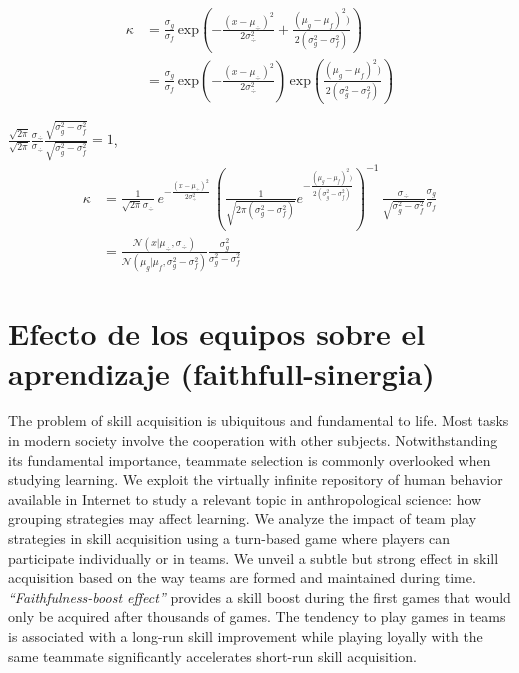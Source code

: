 \documentclass[a4paper,10pt]{book}
\newcommand{\N}{\mathcal{N}}
\theoremstyle{definition}
\newif\ifen
\newif\ifes
\newcommand{\en}[1]{\ifen#1\fi}
\newcommand{\es}[1]{\ifes#1\fi}
\begin{document}
\en{Returning to the original expression}
\begin{equation}
\begin{split}
 \kappa & = \frac{\sigma_g}{\sigma_f}  \, \text{exp}\left(- \frac{(x - \mu_{\div})^2}{2\sigma_{\div}^2} + \frac{(\mu_g - \mu_f)^2)}{2(\sigma_g^2 - \sigma_f^2)}  \right)\\[0.3cm]
 & = \frac{\sigma_g}{\sigma_f} \, \text{exp}\left({-\frac{(x - \mu_{\div})^2}{2\sigma_{\div}^2}}\right) \, \text{exp}\left({\frac{(\mu_g - \mu_f)^2)}{2(\sigma_g^2 - \sigma_f^2)}}\right)
\end{split}
\end{equation}

\en{Multiplying by} $\frac{\sqrt{2\pi}}{\sqrt{2\pi}}\frac{\sigma_{\div}}{\sigma_{\div}}\frac{\sqrt{\sigma_g^2 - \sigma_f^2}}{\sqrt{\sigma_g^2 - \sigma_f^2}}=1$,
\begin{equation}
\begin{split}
 \kappa & =  \frac{1}{\sqrt{2\pi}\sigma_{\div}} \, e^{-\frac{(x - \mu_{\div})^2}{2\sigma_{\div}^2}} \, \left( \frac
 {1}{\sqrt{2\pi(\sigma_g^2 - \sigma_f^2)} } e^{-\frac{(\mu_g - \mu_f)^2)}{2(\sigma_g^2 - \sigma_f^2)}} \right)^{-1} \, \frac{\sigma_{\div}}{\sqrt{\sigma_g^2 - \sigma_f^2}}\frac{\sigma_g}{\sigma_f}\\[0.3cm]
 & = \frac{\N\left(x| \mu_{\div},\sigma_{\div}\right)}{\N\left(\mu_g|\mu_f,\sigma_g^2-\sigma_f^2\right)} \frac{\sigma_g^2}{\sigma_g^2 - \sigma_f^2}
\end{split}
\end{equation}


\chapter{Efecto de los equipos sobre el aprendizaje (faithfull-sinergia)}



The problem of skill acquisition is ubiquitous and fundamental to life.
Most tasks in modern society involve the cooperation with other subjects. 
Notwithstanding its fundamental importance, teammate selection is commonly overlooked when studying learning.
We exploit the virtually infinite repository of human behavior available in Internet to study a relevant topic in anthropological science: how grouping strategies may affect learning.
We analyze the impact of team play strategies in skill acquisition using a turn-based game where players can participate individually or in teams.
We unveil a subtle but strong effect in skill acquisition based on the way teams are formed and maintained during time.
\emph{``Faithfulness-boost effect''} provides a skill boost during the first games that would only be acquired after thousands of games.
The tendency to play games in teams is associated with a long-run skill improvement while playing loyally with the same teammate significantly accelerates short-run skill acquisition.
\end{document}
